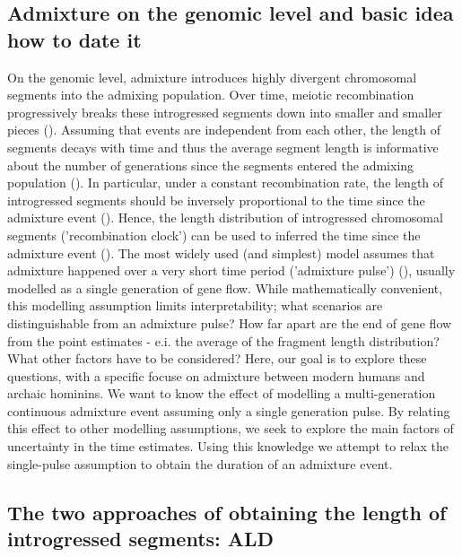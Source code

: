 \documentclass[]{article}
\begin{document}
\subsection{Admixture on the genomic level and basic idea how to date
it}\label{admixture-on-the-genomic-level-and-basic-idea-how-to-date-it}

On the genomic level, admixture introduces highly divergent chromosomal
segments into the admixing population. Over time, meiotic recombination
progressively breaks these introgressed segments down into smaller and
smaller pieces (\cite{falush_inference_2003}). Assuming that events are
independent from each other, the length of segments decays with time and
thus the average segment length is informative about the number of
generations since the segments entered the admixing population
(\cite{moorjani_history_2011,pool_inference_2009,gravel_population_2012}).
In particular, under a constant recombination rate, the length of
introgressed segments should be inversely proportional to the time since
the admixture event (\cite{gravel_population_2012,liang_lengths_2014}).
Hence, the length distribution of introgressed chromosomal segments
('recombination clock') can be used to inferred the time since the
admixture event
(\cite{moorjani_history_2011,pugach_dating_2011,sankararaman_date_2012,loh_inferring_2013,sankararaman_combined_2016,pugach_gateway_2018,jacobs_multiple_2019,hellenthal_genetic_2014}).
The most widely used (and simplest) model assumes that admixture
happened over a very short time period ('admixture pulse')
(\cite{moorjani_history_2011}), usually modelled as a single generation
of gene flow. While mathematically convenient, this modelling assumption
limits interpretability; what scenarios are distinguishable from an
admixture pulse? How far apart are the end of gene flow from the point
estimates - e.i. the average of the fragment length distribution? What
other factors have to be considered? Here, our goal is to explore these
questions, with a specific focuse on admixture between modern humans and
archaic hominins. We want to know the effect of modelling a
multi-generation continuous admixture event assuming only a single
generation pulse. By relating this effect to other modelling assumptions,
we seek to explore the main factors of uncertainty in the time
estimates. Using this knowledge we attempt to relax the single-pulse
assumption to obtain the duration of an admixture event.

\subsection{The two approaches of obtaining the length of introgressed
segments:
ALD}\label{the-two-approaches-of-obtaining-the-length-of-introgressed-segments-ald}
\end{document}
